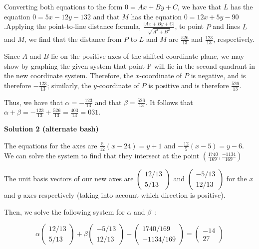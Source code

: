 \begin{enumerate}
 


 Converting both equations to the form $0=Ax+By+C$, we have that $L$ has the equation $0=5x-12y-132$ and that $M$ has the equation $0=12x+5y-90$.Applying the point-to-line distance formula, $\frac{|Ax+By+C|}{\sqrt{A^2+B^2}}$, to point $P$ and lines $L$ and $M$, we find that the distance from $P$ to $L$ and $M$ are $\frac{526}{13}$ and $\frac{123}{13}$, respectively. 

 


 Since $A$ and $B$ lie on the positive axes of the shifted coordinate plane, we may show by graphing the given system that point P will lie in the second quadrant in the new coordinate system. Therefore, the $x$-coordinate of $P$ is negative, and is therefore $-\frac{123}{13}$; similarly, the $y$-coordinate of $P$ is positive and is therefore $\frac{526}{13}$.

 Thus, we have that $\alpha=-\frac{123}{13}$ and that $\beta=\frac{526}{13}$. It follows that $\alpha+\beta=-\frac{123}{13}+\frac{526}{13}=\frac{403}{13}=\boxed{031}$.

 



\textbf{Solution 2 (alternate bash)}

The equations for the axes are $\frac{5}{12} (x-24) = y+1$ and $-\frac{12}{5}(x-5) = y - 6$. We can solve the system to find that they intersect at the point $\left( \frac{1740}{169},\frac{-1134}{169} \right)$

 The unit basis vectors of our new axes are $\begin{pmatrix} 12/13 \\ 5/13 \end{pmatrix}$ and $\begin{pmatrix} -5/13 \\ 12/13 \end{pmatrix}$ for the $x$ and $y$ axes respectively (taking into account which direction is positive). 

 Then, we solve the following system for $\alpha$ and $\beta$ :

 
 \[\alpha \begin{pmatrix} 12/13 \\ 5/13 \end{pmatrix} + \beta \begin{pmatrix} -5/13 \\ 12/13 \end{pmatrix} + \begin{pmatrix} 1740/169 \\ -1134/169 \end{pmatrix} = \begin{pmatrix} -14 \\ 27 \end{pmatrix}\]


\end{enumerate}
